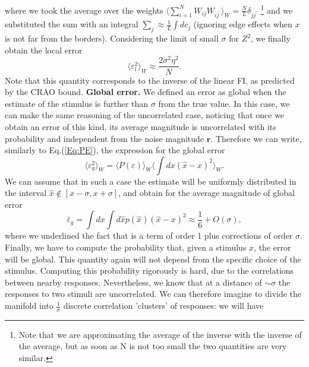 \documentclass[a4paper]{article}%
\begin{document}
where we took the average over the weights $\langle\sum_{i=1}^{N}
W_{ij}W_{ij^{\prime}}\rangle_{W} = \frac{N}{L} \delta_{jj^{\prime}}$
\footnote{Note that we are approximating the average of the inverse with the
inverse of the average, but as soon as N is not too small the two quantities
are very similar.} and we substituted the sum with an integral $\sum_{j}
\approx\frac{1}{L}\int dc_{j}$ (ignoring edge effects when $x$ is not far from
the borders). Considering the limit of small $\sigma$ for $Z^{2}$, we finally
obtain the local error
\begin{equation}
\langle\varepsilon_{l}^{2}\rangle_{W} \approx\frac{2\sigma^{2}\eta^{2}}{N}.
\end{equation}
Note that this quantity corresponds to the inverse of the linear FI, as
predicted by the CRAO bound. \newline\newline\textbf{Global error.} We defined
an error as global when the estimate of the stimulus is further than $\sigma$
from the true value. In this case, we can make the same reasoning of the
uncorrelated case, noticing that once we obtain an error of this kind, its
average magnitude is uncorrelated with its probability and independent from
the noise magnitude $\mathbf{r}$. Therefore we can write, similarly to
Eq.(\ref{Eq:PE}), the expression for the global error
\begin{equation}
\langle\varepsilon^{2}_{g}\rangle_{W} = \langle P(\varepsilon)\rangle_{W}
\langle\int dx (\hat{x}-x)^{2}\rangle_{W}.
\end{equation}
We can assume that in such a case the estimate will be uniformly distributed
in the interval $\hat{x} \not \in [x-\sigma,x+\sigma]$, and obtain for the
average magnitude of global error
\begin{equation}
\bar{\varepsilon}_{g} = \int dx \int d \hat{x} p(\hat{x}) (\hat{x}-x)^{2}
\approx\frac{1}{6} + O(\sigma),
\end{equation}
where we underlined the fact that is a term of order 1 plus corrections of
order $\sigma$. Finally, we have to compute the probability that, given a
stimulus $x$, the error will be global. This quantity again will not depend
from the specific choice of the stimulus. Computing this probability
rigorously is hard, due to the correlations between nearby responses.
Nevertheless, we know that at a distance of $\sim\sigma$ the responses to two
stimuli are uncorrelated. We can therefore imagine to divide the manifold into
$\frac{1}{\sigma}$ discrete correlation 'clusters' of responses: we will have
\end{document}
